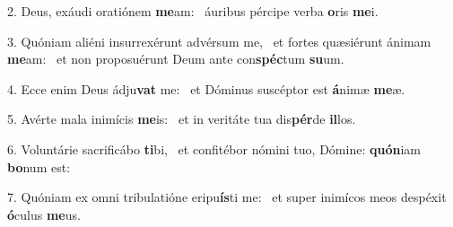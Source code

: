 2. Deus, exáudi oratiónem \textbf{me}am: \ast\  áuribus pércipe verba \textbf{o}ris \textbf{me}i.\

3. Quóniam aliéni insurrexérunt advérsum me, \dag\  et fortes quæsiérunt ánimam \textbf{me}am: \ast\  et non proposuérunt Deum ante con\textbf{spéc}tum \textbf{su}um.\

4. Ecce enim Deus ádju\textbf{vat} me: \ast\  et Dóminus suscéptor est \textbf{á}nimæ \textbf{me}æ.\

5. Avérte mala inimícis \textbf{me}is: \ast\  et in veritáte tua dis\textbf{pér}de \textbf{il}los.\

6. Voluntárie sacrificábo \textbf{ti}bi, \ast\  et confitébor nómini tuo, Dómine: \textbf{quón}iam \textbf{bo}num est:\

7. Quóniam ex omni tribulatióne eripu\textbf{ís}ti me: \ast\  et super inimícos meos despéxit \textbf{ó}culus \textbf{me}us.\

